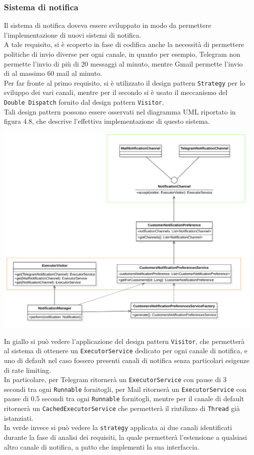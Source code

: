 		\subsubsection{Sistema di notifica}
			Il sistema di notifica doveva essere sviluppato in modo da permettere l'implementazione di nuovi sistemi di notifica.\\
			A tale requisito, si è scoperto in fase di codifica anche la necessità di permettere politiche di invio diverse per ogni canale, in quanto per esempio, Telegram non permette l'invio di più di 20 messaggi al minuto, mentre Gmail permette l'invio di al massimo 60 mail al minuto. \\
			Per far fronte al primo requisito, si è utilizzato il design pattern \texttt{Strategy} per lo sviluppo dei vari canali, mentre per il secondo si è usato il meccanismo del \texttt{Double Dispatch} fornito dal design pattern \texttt{Visitor}.\\
			Tali design pattern possono essere osservati nel  diagramma UML riportato in figura 4.8, che descrive l'effettiva implementazione di questo sistema.
			\begin{center}
				\includegraphics[keepaspectratio = true, width=16cm]{immagini/notifica.png}
			\end{center}
			In giallo si può vedere l'applicazione del design pattern \texttt{Visitor}, che permetterà al sistema di ottenere un \texttt{ExecutorService} dedicato per ogni canale di notifica, e uno di default nel caso fossero presenti canali di notifica senza particolari esigenze di rate limiting. \\
			In particolare, per Telegram ritornerà un \texttt{ExecutorService} con pause di 3 secondi tra ogni \texttt{Runnable} fornitogli,  per Mail ritornerà un \texttt{ExecutorService} con pause di 0.5 secondi tra ogni \texttt{Runnable} fornitogli, mentre per il canale di default ritornerà un \texttt{CachedExecutorService} che permetterà il riutilizzo di \texttt{Thread} già istanziati.\\
			In verde invece si può vedere la \texttt{strategy} applicata ai due canali identificati durante la fase di analisi dei requisiti, la quale permetterà l'estensione a qualsiasi altro canale di notifica, a patto che implementi la sua interfaccia.\\
